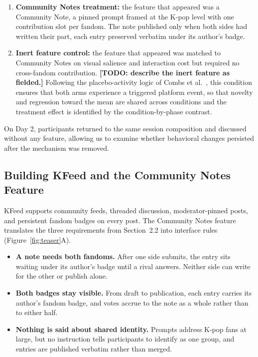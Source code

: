 \documentclass[manuscript,screen,review,anonymous]{acmart}
\newcommand{\todonote}[1]{\textcolor{orange!80!black}{\textbf{[TODO: #1]}}}
\begin{document}
\begin{enumerate}
  \item \textbf{Community Notes treatment:} the feature that appeared was a
  Community Note, a pinned prompt framed at the K-pop level with one
  contribution slot per fandom. The note published only when both sides had
  written their part, each entry preserved verbatim under its author's badge.
  \item \textbf{Inert feature control:} the feature that appeared was matched
  to Community Notes on visual salience and interaction cost but required no
  cross-fandom contribution. \todonote{describe the inert feature as
  fielded.} Following the placebo-activity logic of Combs et
  al.~\cite{combs2023}, this condition ensures that both arms experience a
  triggered platform event, so that novelty and regression toward the mean
  are shared across conditions and the treatment effect is identified by the
  condition-by-phase contrast.
\end{enumerate}

On Day 2, participants returned to the same session composition and discussed
without any feature, allowing us to examine whether behavioral changes
persisted after the mechanism was removed.

\subsection{Building KFeed and the Community Notes Feature}

KFeed supports community feeds, threaded discussion, moderator-pinned posts,
and persistent fandom badges on every post. The Community Notes feature
translates the three requirements from Section~2.2 into interface rules
(Figure~\ref{fig:teaser}A).

\begin{itemize}
  \item \textbf{A note needs both fandoms.} After one side submits, the entry
  sits waiting under its author's badge until a rival answers. Neither side
  can write for the other or publish alone.
  \item \textbf{Both badges stay visible.} From draft to publication, each
  entry carries its author's fandom badge, and votes accrue to the note as a
  whole rather than to either half.
  \item \textbf{Nothing is said about shared identity.} Prompts address K-pop
  fans at large, but no instruction tells participants to identify as one
  group, and entries are published verbatim rather than merged.
\end{itemize}
\end{document}
